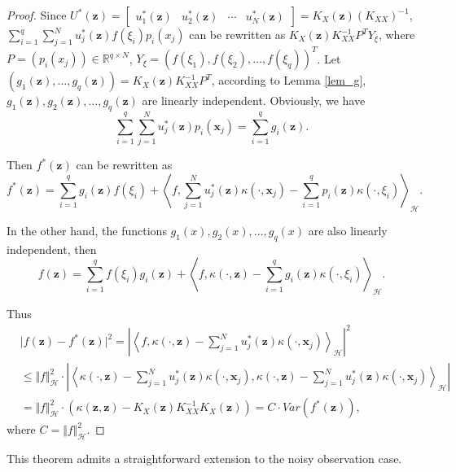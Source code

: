 \documentclass[preprint,review,sort&compress,3p]{elsarticle}
\begin{document}
\begin{proof}
	Since $U^*(\boldsymbol{z}) =\begin{bmatrix}u_1^*(\boldsymbol{z}) & u_2^*(\boldsymbol{z}) &\cdots &u_N^*(\boldsymbol{z}) \end{bmatrix}= K_X (\boldsymbol{z}) (K_{XX})^{-1}$,  $\sum\limits_{i = 1}^q \sum\limits_{j = 1}^N u_j^*(\boldsymbol{z}) f(\xi_i) p_i(x_j) $ can be rewritten as $ K_X(\boldsymbol{z}) K_{XX}^{-1} P^T Y_{\xi}$, where $P = (p_i(x_j))\in \mathbb{R}^{q\times N}$, $Y_{\xi} =(f(\xi_1),f(\xi_2), \dots, f(\xi_q) )^T $. Let $(g_1(\boldsymbol{z}),\dots,g_q(\boldsymbol{z})) =K_X(\boldsymbol{z}) K_{XX}^{-1} P^T $, according to Lemma \ref{lem_g}, $g_1(\boldsymbol{z}), g_2(\boldsymbol{z}),\dots,g_q(\boldsymbol{z})$ are linearly independent. Obviously, we have 
	$$
	\sum\limits_{i = 1}^q \sum\limits_{j = 1}^N u_j^*(\boldsymbol{z})  p_i(\boldsymbol{x}_j) = \sum\limits_{i = 1}^q  g_i(\boldsymbol{z} ) .
	$$ 
	
	Then $f^*(\boldsymbol{z})$ can be rewritten as 
	\begin{equation}
		f^*(\boldsymbol{z}) = \sum\limits_{i = 1}^q  g_i(\boldsymbol{z}) f(\xi_i) +\left\langle f, \sum\limits_{j = 1}^N u_j^*(\boldsymbol{z})\kappa(\cdot,\boldsymbol{x}_j)- \sum\limits_{i= 1}^q p_i(\boldsymbol{z})\kappa(\cdot,\xi_i)\right\rangle_\mathcal{H}. 
	\end{equation}
	
	In the other hand, the functions $g_1(x), g_2(x),\dots,g_q(x)$ are also linearly independent, then 
	\begin{equation}
		f(\boldsymbol{z}) = \sum\limits_{i = 1}^q f(\xi_i) g_i(\boldsymbol{z}) +\left\langle f,\kappa(\cdot,\boldsymbol{z})-\sum\limits_{i= 1}^q g_i(\boldsymbol{z})\kappa(\cdot,\xi_i) \right\rangle_\mathcal{H}.
	\end{equation}
	
	Thus 
	$$
	\begin{aligned}
		&\vert f(\boldsymbol{z}) - f^*(\boldsymbol{z})\vert^2 =\left\vert \left \langle f,\kappa(\cdot,\boldsymbol{z}) - \sum\limits_{j = 1}^N u_j^*(\boldsymbol{z})\kappa(\cdot,\boldsymbol{x}_j) \right \rangle_\mathcal{H} \right\vert^2 \\
		&\le \Vert f\Vert_\mathcal{H}^2 \cdot \left\vert \left \langle \kappa(\cdot,\boldsymbol{z}) - \sum\limits_{j = 1}^N u_j^*(\boldsymbol{z})\kappa(\cdot,\boldsymbol{x}_j), \kappa(\cdot,\boldsymbol{z}) - \sum\limits_{j = 1}^N u_j^*(\boldsymbol{z})\kappa(\cdot,\boldsymbol{x}_j) \right \rangle_\mathcal{H} \right\vert\\
		&= \Vert f\Vert_\mathcal{H}^2 \cdot \left(\kappa(\boldsymbol{z},\boldsymbol{z})- K_X(\boldsymbol{z}) K_{XX}^{-1} K_X(\boldsymbol{z})\right) = C\cdot Var(f^*(\boldsymbol{z})), 
	\end{aligned}
	$$
	where $C =\Vert f\Vert_\mathcal{H}^2$. 
\end{proof}
This theorem admits a straightforward extension to the noisy observation case.
\end{document}
